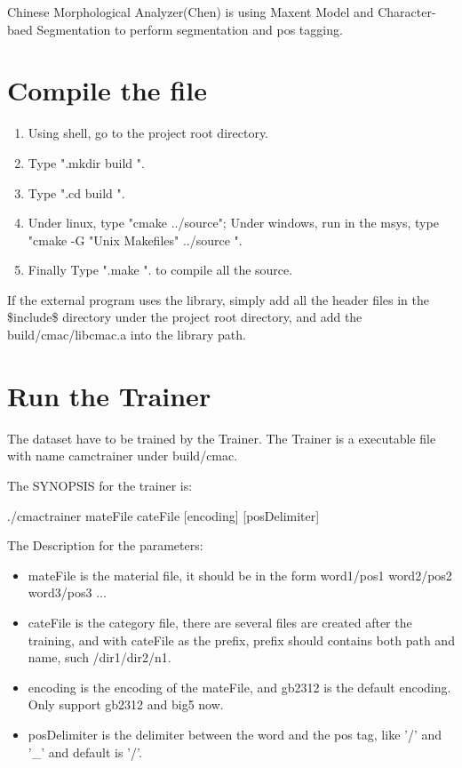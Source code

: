 Chinese Morphological Analyzer(Chen) is using Maxent Model and Character-baed Segmentation to perform segmentation and pos tagging.\section{Compile the file}\label{index_compilefile}
\begin{enumerate}
\item Using shell, go to the project root directory. \item Type ".mkdir build ". \item Type ".cd build ". \item Under linux, type "cmake ../source"; Under windows, run in the msys, type "cmake -G "Unix Makefiles" ../source ". \item Finally Type ".make ". to compile all the source. \end{enumerate}


If the external program uses the library, simply add all the header files in the \$include\$ directory under the project root directory, and add the build/cmac/libcmac.a into the library path.\section{Run the Trainer}\label{index_runtrainer}
The dataset have to be trained by the Trainer. The Trainer is a executable file with name camctrainer under build/cmac.

The SYNOPSIS for the trainer is: \par
 ./cmactrainer mateFile cateFile [encoding] [posDelimiter] \par


\par
The Description for the parameters: \begin{itemize}
\item mateFile is the material file, it should be in the form word1/pos1 word2/pos2 word3/pos3 ... \item cateFile is the category file, there are several files are created after the training, and with cateFile as the prefix, prefix should contains both path and name, such /dir1/dir2/n1. \item encoding is the encoding of the mateFile, and gb2312 is the default encoding. Only support gb2312 and big5 now. \item posDelimiter is the delimiter between the word and the pos tag, like '/' and '\_\-' and default is '/'. \end{itemize}


